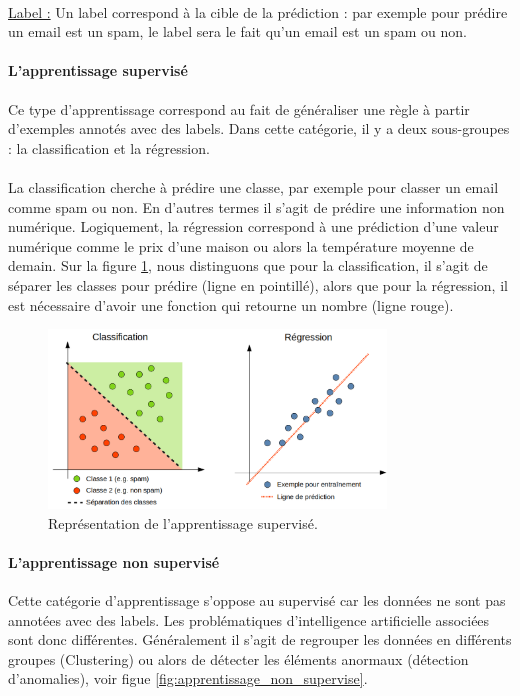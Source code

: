 \documentclass[10pt, french, a4paper]{report}
\begin{document}
\paragraph{}
\underline{Label :} Un label correspond à la cible de la prédiction : par exemple pour prédire un email est un spam, le label sera le fait qu'un email est un spam ou non.

\paragraph{L'apprentissage supervisé}
Ce type d'apprentissage correspond au fait de généraliser une règle à partir d'exemples annotés avec des labels. Dans cette catégorie, il y a deux sous-groupes : la classification et la régression.

\paragraph{}
La classification cherche à prédire une classe, par exemple pour classer un email comme spam ou non. En d'autres termes il s'agit de prédire une information non numérique. Logiquement, la régression correspond à une prédiction d'une valeur numérique comme le prix d'une maison ou alors la température moyenne de demain. Sur la figure \ref{fig:apprentissage_supervise}, nous distinguons que pour la classification, il s'agit de séparer les classes pour prédire (ligne en pointillé), alors que pour la régression, il est nécessaire d'avoir une fonction qui retourne un nombre (ligne rouge).

\begin{figure}[hbt!]
    \centering
    \includegraphics[width=0.8\textwidth]{images/apprentissage_supervise.png}
    \caption{Représentation de l'apprentissage supervisé.}
    \label{fig:apprentissage_supervise}
\end{figure}

\paragraph{L'apprentissage non supervisé}
Cette catégorie d'apprentissage s'oppose au supervisé car les données ne sont pas annotées avec des labels. Les problématiques d'intelligence artificielle associées sont donc différentes. Généralement il s'agit de regrouper les données en différents groupes (Clustering) ou alors de détecter les éléments anormaux (détection d'anomalies), voir figue \ref{fig:apprentissage_non_supervise}.
\end{document}
